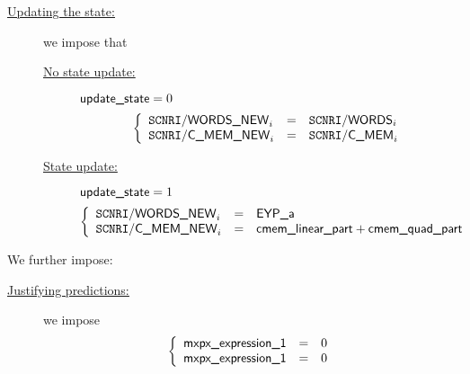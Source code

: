 \begin{description}
\[		\]
	\item[\underline{\underline{Updating the state:}}] 
		we impose that
		\begin{description}
			\item[\underline{No state update:}]
				\If $\textsf{update\_state} = 0$ \Then
				\[
					\left\{ \begin{array}{lcl}
						\texttt{SCNRI}\textsf{/}{\textsf{\textsf{WORDS\_NEW}}} _{i} & = & \texttt{SCNRI}\textsf{/}{\textsf{\textsf{WORDS}}} _{i} \\
						\texttt{SCNRI}\textsf{/}{\textsf{\textsf{C\_MEM\_NEW}}}  _{i} & = & \texttt{SCNRI}\textsf{/}{\textsf{\textsf{C\_MEM}}}  _{i} \\
					\end{array} \right.
				\]
			\item[\underline{State update:}]
				\If $\textsf{update\_state} = 1$ \Then
				\[
					\left\{ \begin{array}{lcl}
						\texttt{SCNRI}\textsf{/}{\textsf{\textsf{WORDS\_NEW}}} _{i} & = & \textsf{EYP\_a}                            \\
						\texttt{SCNRI}\textsf{/}{\textsf{\textsf{C\_MEM\_NEW}}}  _{i} & = & \textsf{cmem\_linear\_part} + \textsf{cmem\_quad\_part} \\
					\end{array} \right.
				\]
		\end{description}
\end{description}

We further impose:
\begin{description}
	\item[\underline{\underline{Justifying \hubMod{} predictions:}}]
		we impose
		\[
			\left\{ \begin{array}{lcl}
				\textsf{mxpx\_expression\_1} & = & 0 \\
				\textsf{mxpx\_expression\_1} & = & 0 \\
			\end{array} \right.
		\]
\end{description}


